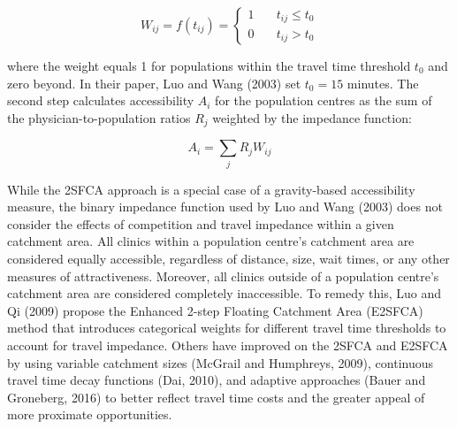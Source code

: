 \documentclass[]{elsarticle} %
\begin{document}
\begin{equation}
\label{eq:fca_W_ij_binary}
W_{ij} = f(t_{ij}) = \left\{
        \begin{array}{ll}
            1 & \quad t_{ij} \leq t_0 \\
            0 & \quad t_{ij} > t_0
        \end{array}
    \right.
\end{equation}

\noindent where the weight equals 1 for populations within the travel
time threshold \(t_0\) and zero beyond. In their paper, Luo and Wang
(2003) set \(t_0 = 15\) minutes. The second step calculates
accessibility \(A_i\) for the population centres as the sum of the
physician-to-population ratios \(R_j\) weighted by the impedance
function:

\begin{equation}
\label{eq:fca_A_i}
A_i = \sum_j{R_jW_{ij}}
\end{equation}

While the 2SFCA approach is a special case of a gravity-based
accessibility measure, the binary impedance function used by Luo and
Wang (2003) does not consider the effects of competition and travel
impedance within a given catchment area. All clinics within a population
centre's catchment area are considered equally accessible, regardless of
distance, size, wait times, or any other measures of attractiveness.
Moreover, all clinics outside of a population centre's catchment area
are considered completely inaccessible. To remedy this, Luo and Qi
(2009) propose the Enhanced 2-step Floating Catchment Area (E2SFCA)
method that introduces categorical weights for different travel time
thresholds to account for travel impedance. Others have improved on the
2SFCA and E2SFCA by using variable catchment sizes (McGrail and
Humphreys, 2009), continuous travel time decay functions (Dai, 2010),
and adaptive approaches (Bauer and Groneberg, 2016) to better reflect
travel time costs and the greater appeal of more proximate
opportunities.
\end{document}

